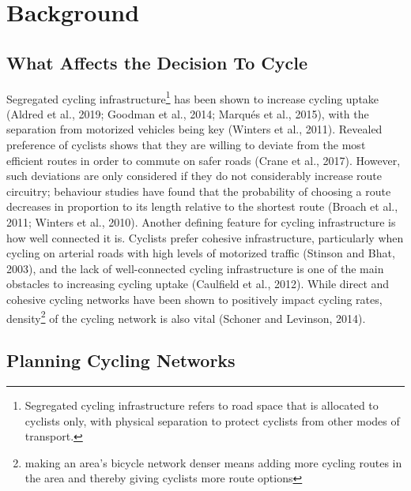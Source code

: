 \documentclass[]{elsarticle} %
\begin{document}
\hypertarget{background}{%
\section{Background}\label{background}}

\hypertarget{what-affects-the-decision-to-cycle}{%
\subsection{What Affects the Decision To
Cycle}\label{what-affects-the-decision-to-cycle}}

Segregated cycling
infrastructure\footnote{Segregated cycling infrastructure refers to road space that is allocated to cyclists only, with physical separation to protect cyclists from other modes of transport.}
has been shown to increase cycling uptake (Aldred et al., 2019; Goodman
et al., 2014; Marqués et al., 2015), with the separation from motorized
vehicles being key (Winters et al., 2011). Revealed preference of
cyclists shows that they are willing to deviate from the most efficient
routes in order to commute on safer roads (Crane et al., 2017). However,
such deviations are only considered if they do not considerably increase
route circuitry; behaviour studies have found that the probability of
choosing a route decreases in proportion to its length relative to the
shortest route (Broach et al., 2011; Winters et al., 2010). Another
defining feature for cycling infrastructure is how well connected it is.
Cyclists prefer cohesive infrastructure, particularly when cycling on
arterial roads with high levels of motorized traffic (Stinson and Bhat,
2003), and the lack of well-connected cycling infrastructure is one of
the main obstacles to increasing cycling uptake (Caulfield et al.,
2012). While direct and cohesive cycling networks have been shown to
positively impact cycling rates,
density\footnote{making an area's bicycle network denser means adding more cycling routes in the area and thereby giving cyclists more route options}
of the cycling network is also vital (Schoner and Levinson, 2014).

\hypertarget{planning-cycling-networks}{%
\subsection{Planning Cycling Networks}\label{planning-cycling-networks}}
\end{document}
